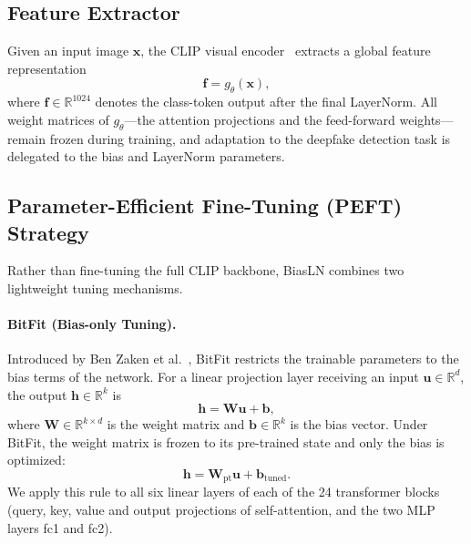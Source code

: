 \documentclass[fonts]{icst}
\begin{document}
\subsection{Feature Extractor}

Given an input image $\mathbf{x}$, the CLIP visual encoder~\cite{radford2021clip_vitl} extracts a global feature representation
\begin{equation}
\mathbf{f} = g_{\theta}(\mathbf{x}),
\end{equation}
where $\mathbf{f} \in \mathbb{R}^{1024}$ denotes the class-token output after the final LayerNorm.
All weight matrices of $g_{\theta}$---the attention projections and the feed-forward weights---remain frozen during training, and adaptation to the deepfake detection task is delegated to the bias and LayerNorm parameters.

\subsection{Parameter-Efficient Fine-Tuning (PEFT) Strategy}
\label{sec:peft}

Rather than fine-tuning the full CLIP backbone, BiasLN combines two lightweight tuning mechanisms.

\paragraph{BitFit (Bias-only Tuning).}
Introduced by Ben Zaken et al.~\cite{benzaken2022bitfit}, BitFit restricts the trainable parameters to the bias terms of the network.
For a linear projection layer receiving an input $\mathbf{u} \in \mathbb{R}^{d}$, the output $\mathbf{h} \in \mathbb{R}^{k}$ is
\begin{equation}
    \mathbf{h} = \mathbf{W}\mathbf{u} + \mathbf{b},
\end{equation}
where $\mathbf{W} \in \mathbb{R}^{k \times d}$ is the weight matrix and $\mathbf{b} \in \mathbb{R}^{k}$ is the bias vector.
Under BitFit, the weight matrix is frozen to its pre-trained state and only the bias is optimized:
\begin{equation}
    \mathbf{h} = \mathbf{W}_{\text{pt}}\mathbf{u} + \mathbf{b}_{\text{tuned}}.
\end{equation}
We apply this rule to all six linear layers of each of the 24 transformer blocks (query, key, value and output projections of self-attention, and the two MLP layers fc1 and fc2).
\end{document}
